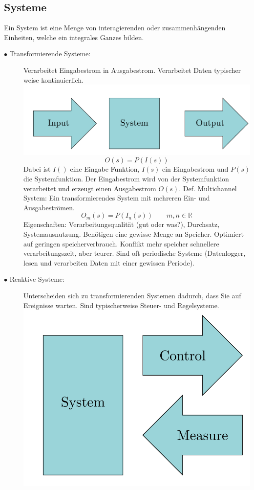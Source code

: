 \documentclass[a4paper, 8pt]{extarticle}
\begin{document}
\begin{multicols*}{3}
				\subsection{Systeme}
				Ein System ist eine Menge von interagierenden oder zusammenhängenden Einheiten, welche ein integrales Ganzes bilden.\\
					\begin{description}
						\item[$\bullet$ Transformierende Systeme:]%
							Verarbeitet Eingabestrom in Ausgabestrom. Verarbeitet Daten typischer weise kontinuierlich.
							\includegraphics[width=0.8\linewidth,left]{img/Transformierende_Systeme.PNG} 
							\begin{equation}
								O(s)=P(I(s))
							\end{equation}	
							Dabei ist $I()$ eine Eingabe Funktion, $I(s)$ ein Eingabestrom und $P(s)$ die Systemfunktion. Der Eingabestrom
							wird von der Systemfunktion verarbeitet und erzeugt einen Ausgabestrom $O(s)$. Def. \dq Multichannel System\dq: Ein transformierendes System
							mit mehreren Ein- und Ausgabeströmen. 
							\begin{equation}
								O_m(s)=P(I_n(s)) \qquad m,n \in \mathbb{R}
							\end{equation}
							Eigenschaften: Verarbeitungsqualität (gut oder was?), Durchsatz, Systemausnutzung. Benötigen eine gewisse Menge an Speicher. Optimiert auf
							geringen speicherverbrauch. Konflikt mehr speicher schnellere verarbeitungszeit, aber teurer. Sind oft periodische Systeme (Datenlogger, lesen und verarbeiten Daten mit einer gewissen Periode).
						\item[$\bullet$ Reaktive Systeme:]%
							Unterscheiden sich zu transformierenden Systemen dadurch, dass Sie auf Ereignisse warten. Sind typischerweise Steuer- und Regelsysteme.
							\includegraphics[width=0.6\linewidth,left]{img/Reaktive_Systeme.PNG}

\end{description}
\end{multicols*}
\end{document}
